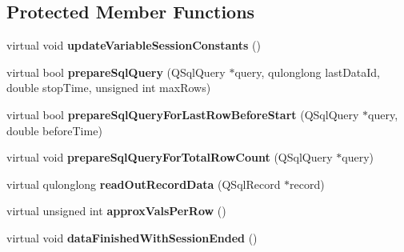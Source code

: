 \subsection*{Protected Member Functions}
\begin{DoxyCompactItemize}
\item 
\hypertarget{class_picto_1_1_l_f_p_data_iterator_ac6c4864beb21349b7ea4baf923f876be}{virtual void {\bfseries update\-Variable\-Session\-Constants} ()}\label{class_picto_1_1_l_f_p_data_iterator_ac6c4864beb21349b7ea4baf923f876be}

\item 
\hypertarget{class_picto_1_1_l_f_p_data_iterator_a4e3a40e0f2b920654df6a5d0f0f585bf}{virtual bool {\bfseries prepare\-Sql\-Query} (Q\-Sql\-Query $\ast$query, qulonglong last\-Data\-Id, double stop\-Time, unsigned int max\-Rows)}\label{class_picto_1_1_l_f_p_data_iterator_a4e3a40e0f2b920654df6a5d0f0f585bf}

\item 
\hypertarget{class_picto_1_1_l_f_p_data_iterator_a1982fbbff411b64a191f718fddc98ed7}{virtual bool {\bfseries prepare\-Sql\-Query\-For\-Last\-Row\-Before\-Start} (Q\-Sql\-Query $\ast$query, double before\-Time)}\label{class_picto_1_1_l_f_p_data_iterator_a1982fbbff411b64a191f718fddc98ed7}

\item 
\hypertarget{class_picto_1_1_l_f_p_data_iterator_acfa0f789b0f11f7b9da0b39c11c1ae49}{virtual void {\bfseries prepare\-Sql\-Query\-For\-Total\-Row\-Count} (Q\-Sql\-Query $\ast$query)}\label{class_picto_1_1_l_f_p_data_iterator_acfa0f789b0f11f7b9da0b39c11c1ae49}

\item 
\hypertarget{class_picto_1_1_l_f_p_data_iterator_a43049443e97c6446fefd1e2f26948c0e}{virtual qulonglong {\bfseries read\-Out\-Record\-Data} (Q\-Sql\-Record $\ast$record)}\label{class_picto_1_1_l_f_p_data_iterator_a43049443e97c6446fefd1e2f26948c0e}

\item 
\hypertarget{class_picto_1_1_l_f_p_data_iterator_ad6588c22d22334ce5ac96296d2e80831}{virtual unsigned int {\bfseries approx\-Vals\-Per\-Row} ()}\label{class_picto_1_1_l_f_p_data_iterator_ad6588c22d22334ce5ac96296d2e80831}

\item 
\hypertarget{class_picto_1_1_l_f_p_data_iterator_abb0d86633482fa846866e192c703f712}{virtual void {\bfseries data\-Finished\-With\-Session\-Ended} ()}\label{class_picto_1_1_l_f_p_data_iterator_abb0d86633482fa846866e192c703f712}

\end{DoxyCompactItemize}



